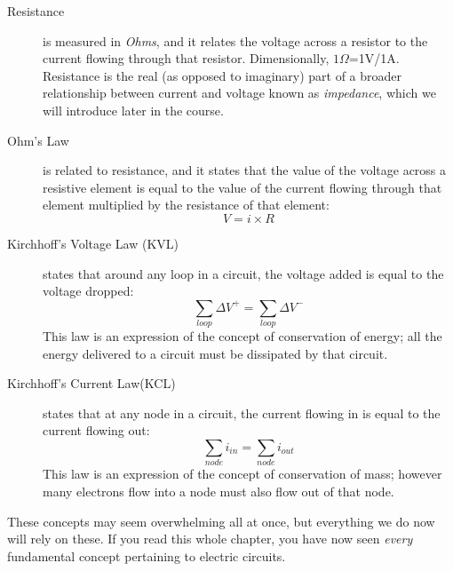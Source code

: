\begin{description}
\item[Resistance] is measured in \textit{Ohms}, and it relates the voltage across a resistor to the current flowing through that resistor. Dimensionally, $1\Omega$=1V/1A. Resistance is the real (as opposed to imaginary) part of a broader relationship between current and voltage known as \textit{impedance}, which we will introduce later in the course.

\item[Ohm's Law] is related to resistance, and it states that the value of the voltage across a resistive element is equal to the value of the current flowing through that element multiplied by the resistance of that element:
$$V=i \times R$$

\item[Kirchhoff's Voltage Law (KVL)] states that around any loop in a circuit, the voltage added is equal to the voltage dropped:
$$\sum_{loop}{\Delta V^+} = \sum_{loop}{\Delta V^-}$$
This law is an expression of the concept of conservation of energy; all the energy delivered to a circuit must be dissipated by that circuit.
\item[Kirchhoff's Current Law(KCL)] states that at any node in a circuit, the current flowing in is equal to the current flowing out:
$$\sum_{node}{i_{in}} = \sum_{node}{i_{out}}$$
This law is an expression of the concept of conservation of mass; however many electrons flow into a node must also flow out of that node.
\end{description}
\par
These concepts may seem overwhelming all at once, but everything we do now will rely on these. If you read this whole chapter, you have now seen \textit{every} fundamental concept pertaining to electric circuits.